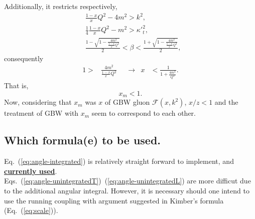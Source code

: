 \documentclass[12pt]{article}
\begin{document}
Additionally, it restricts respectively,
\begin{align}
&\frac{1-x}{x}Q^2-4m^2>k^2,\\
&\frac{1}{4} \frac{1-x}{x}Q^2-m^2>{\kappa'}_t^2,\\
&\frac{1-\sqrt{1-\frac{4m^2}{\frac{1-x}{x} Q^2  }}}{2}<\beta< \frac{1+\sqrt{1-\frac{4m^2}{\frac{1-x}{x} Q^2  }}}{2},
\end{align}
consequently
\begin{align}
1>&\frac{4m^2}{\frac{1-x}{x} Q^2 }&& \rightarrow& x&<\frac{1}{1+\frac{4m^2}{Q^2}}.
\end{align}
That is, 
\begin{equation}
x_{m}<1.
\end{equation}
Now, considering that $x_m$ was $x$ of GBW gluon $\mathcal{F}(x,k^2)$, $x/z<1$ and the treatment of GBW with $x_m$ seem to correspond to each other.

\subsection{Which formula(e) to be used.}
Eq.~(\ref{eq:angle-integrated}) is relatively straight forward to implement, and \underline{\textbf{currently used}}. \\
Eqs.~(\ref{eq:angle-unintegratedT})~(\ref{eq:angle-unintegratedL}) are more difficut due to the additional angular integral. However, it is necessary should one intend to use the running coupling with argument suggested in Kimber's formula (Eq.~(\ref{eq:scale})).
\end{document}
